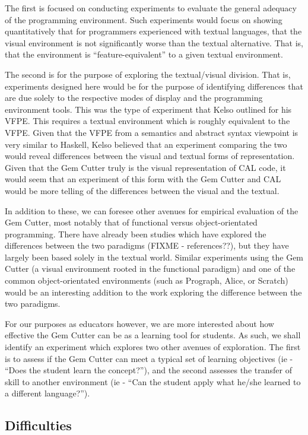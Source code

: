 The first is focused on conducting experiments to evaluate the general adequacy of the programming environment.  Such experiments would focus on showing quantitatively that for programmers experienced with textual languages, that the visual environment is not significantly worse than the textual alternative.  That is, that the environment is ``feature-equivalent'' to a given textual environment.

The second is for the purpose of exploring the textual/visual division.  That is, experiments designed here would be for the purpose of identifying differences that are due solely to the respective modes of display and the programming environment tools.  This was the type of experiment that Kelso outlined for his VFPE.  This requires a textual environment which is roughly equivalent to the VFPE.  
Given that the VFPE from a semantics and abstract syntax viewpoint is very similar to Haskell, Kelso believed that an experiment comparing the two would reveal differences between the visual and textual forms of representation.  Given that the Gem Cutter truly is the visual representation of CAL code, it would seem that an experiment of this form with the Gem Cutter and CAL would be more telling of the differences between the visual and the textual.

In addition to these, we can foresee other avenues for empirical evaluation of the Gem Cutter, most notably that of functional versus object-orientated programming.  There have already been studies which have explored the differences between the two paradigms (FIXME - references??), but they have largely been based solely in the textual world.  Similar experiments using the Gem Cutter (a visual environment rooted in the functional paradigm) and one of the common object-orientated environments (such as Prograph, Alice, or Scratch) would be an interesting addition to the work exploring the difference between the two paradigms.

For our purposes as educators however, we are more interested about how effective the Gem Cutter can be as a learning tool for students.  As such, we shall identify an experiment which explores two other avenues of exploration.  The first is to assess if the Gem Cutter can meet a typical set of learning objectives (ie - ``Does the student learn the concept?''), and the second assesses the transfer of skill to another environment (ie - ``Can the student apply what he/she learned to a different language?'').

\subsection{Difficulties}

